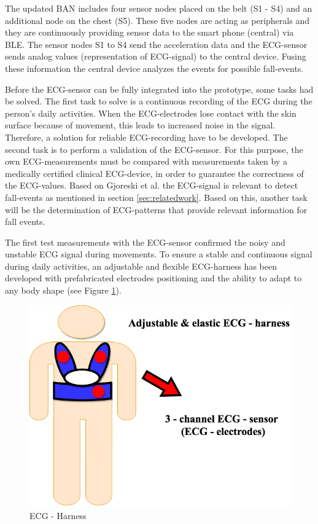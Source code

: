 \documentclass[review]{elsarticle}
\begin{document}
The updated BAN includes four sensor nodes placed on the belt (S1 - S4) and an additional node on the chest (S5). These five nodes are acting as peripherals and they are continuously providing sensor data to the smart phone (central) via BLE. The sensor nodes S1 to S4 send the acceleration data and the ECG-sensor sends analog values (representation of ECG-signal) to the central device. Fusing these information the central device analyzes the events for possible fall-events.

Before the ECG-sensor can be fully integrated into the prototype, some tasks had be solved. The first task to solve is a continuous recording of the ECG during the person's daily activities. When the ECG-electrodes lose contact with the skin surface because of movement, this leads to increased noise in the signal. Therefore, a solution for reliable ECG-recording have to be developed. The second task is to perform a validation of the ECG-sensor. For this purpose, the own ECG-measurements must be compared with measurements taken by a medically certified clinical ECG-device, in order to guarantee the correctness of the ECG-values. Based on Gjoreski et al. \cite{Gjoreski2014} the ECG-signal is relevant to detect fall-events as mentioned in section \ref{sec:relatedwork}. Based on this, another task will be the determination of ECG-patterns that provide relevant information for fall events.

The first test measurements with the ECG-sensor confirmed the noisy and unstable ECG signal during movements. To ensure a stable and continuous signal during daily activities, an adjustable and flexible ECG-harness has been developed with prefabricated electrodes positioning and the ability to adapt to any body shape (see Figure \ref{fig:ECGHarness}).
\begin{figure}[!ht]
	\centering
	\includegraphics[scale=0.32]{Images/ECG-Harness.png}
	\caption[ECG - Harness]{ECG - Harness}
	\label{fig:ECGHarness}
\end{figure}
\end{document}
